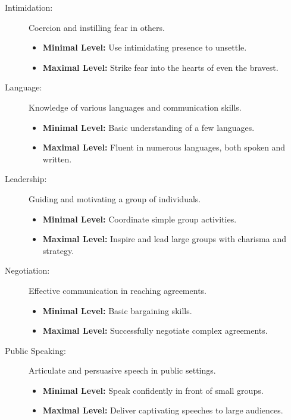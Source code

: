 \begin{description}
    \item[Intimidation:] Coercion and instilling fear in others.
        \begin{itemize}
            \item \textbf{Minimal Level:} Use intimidating presence to unsettle.
            \item \textbf{Maximal Level:} Strike fear into the hearts of even the bravest.
        \end{itemize}

    \item[Language:] Knowledge of various languages and communication skills.
        \begin{itemize}
            \item \textbf{Minimal Level:} Basic understanding of a few languages.
            \item \textbf{Maximal Level:} Fluent in numerous languages, both spoken and written.
        \end{itemize}

    \item[Leadership:] Guiding and motivating a group of individuals.
        \begin{itemize}
            \item \textbf{Minimal Level:} Coordinate simple group activities.
            \item \textbf{Maximal Level:} Inspire and lead large groups with charisma and strategy.
        \end{itemize}

    \item[Negotiation:] Effective communication in reaching agreements.
        \begin{itemize}
            \item \textbf{Minimal Level:} Basic bargaining skills.
            \item \textbf{Maximal Level:} Successfully negotiate complex agreements.
        \end{itemize}

    \item[Public Speaking:] Articulate and persuasive speech in public settings.
        \begin{itemize}
            \item \textbf{Minimal Level:} Speak confidently in front of small groups.
            \item \textbf{Maximal Level:} Deliver captivating speeches to large audiences.
        \end{itemize}


\end{description}
